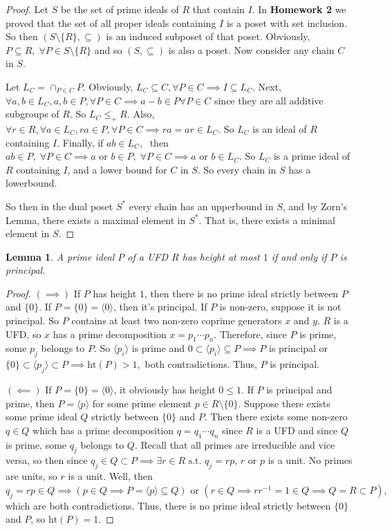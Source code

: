 \documentclass[addpoints,10pt]{exam}
\theoremstyle{plain}
\theoremstyle{definition}
\theoremstyle{plain}
\theoremstyle{plain}
\newtheorem{lem}[thm]{Lemma}
\theoremstyle{definition}
\begin{document}
\begin{proof}
    Let $S$ be the set of prime ideals of $R$ that contain $I$. In \textbf{Homework 2} we proved that the set of all proper ideals containing $I$ is a poset with set inclusion. So then $(S\setminus \{R\},\subseteq)$ is an induced subposet of that poset. Obviously, $P\subseteq R,\;\forall P\in S\setminus\{R\}$ and so $(S,\subseteq)$ is also a poset. Now consider any chain $C$ in $S$.

    Let $L_{C}=\cap_{P\in C}P$. Obviously, $L_{C}\subseteq C,\forall P\in C\implies I\subseteq L_{C}$. Next, $\forall a,b\in L_{C}, a,b\in P,\forall P\in C\implies a-b\in P\forall P\in C$ since they are all additive subgroups of $R$. So $L_{C}\leq_{+}R$. Also, $\forall r\in R, \forall a\in L_{C}, ra\in P, \forall P\in C\implies ra=ar\in L_{C}$. So $L_{C}$ is an ideal of $R$ containing $I$. Finally, if $ab\in L_{C},\;$ then $ab\in P,\;\forall P\in C\implies a\text{ or }b\in P,\;\forall P\in C\implies a\text{ or }b\in L_{C}$. So $L_{C}$ is a prime ideal of $R$ containing $I$, and a lower bound for $C$ in $S$. So every chain in $S$ has a lowerbound. 
    
    So then in the dual poset $S^{*}$ every chain has an upperbound in $S$, and by Zorn's Lemma, there exists a maximal element in $S^{*}$. That is, there exists a minimal element in $S$.
    
\end{proof}
\begin{lem}\label{lem:UFDkrull} A prime ideal $P$ of a UFD $R$ has height at most $1$ if and only if $P$ is principal. 
\end{lem}
\begin{proof}
$(\implies)$ If $P$ has height $1$, then there is no prime ideal strictly between $P$ and $\{0\}$. If $P=\{0\}=\langle 0\rangle$, then it's principal. If $P$ is non-zero, suppose it is not principal. So $P$ contains at least two non-zero coprime generators $x$ and $y$. $R$ is a UFD, so $x$ has a prime decomposition $x=p_{1}\cdots p_{n}$. Therefore, since $P$ is prime, some $p_{j}$ belongs to $P$. So $\langle p_{i}\rangle$ is prime and ${0}\subset \langle p_{i}\rangle \subseteq P\implies P$ is principal or $\{0\}\subset \langle p_{j}\rangle \subset P\implies \mathrm{ht}(P)> 1,$ both contradictions. Thus, $P$ is principal.

$(\impliedby)$ If $P=\{0\}=\langle 0\rangle$, it obviously has height $0\leq 1$. If $P$ is principal and prime, then $P=\langle p\rangle$ for some prime element $p\in R\setminus\{0\}$. Suppose there exists some prime ideal $Q$ strictly between $\{0\}$ and $P$. Then there exists some non-zero $q\in Q$ which has a prime decomposition $q=q_{1}\cdots q_{n}$ since $R$ is a UFD and since $Q$ is prime, some $q_{j}$ belongs to $Q$. Recall that all primes are irreducible and vice versa, so then since $q_{j}\in Q\subset P\implies \exists r\in R\text{ s.t. } q_{j}=rp$, $r$ or $p$ is a unit. No primes are units, so $r$ is a unit. Well, then $q_{j}=rp\in Q\implies (p\in Q\implies P=\langle p\rangle \subseteq Q)\text{ or }(r\in Q\implies rr^{-1}=1\in Q\implies Q=R\subset P),$ which are both contradictions. Thus, there is no prime ideal strictly between $\{0\}$ and $P$, so $\mathrm{ht}(P)=1$.
\end{proof}
\end{document}
